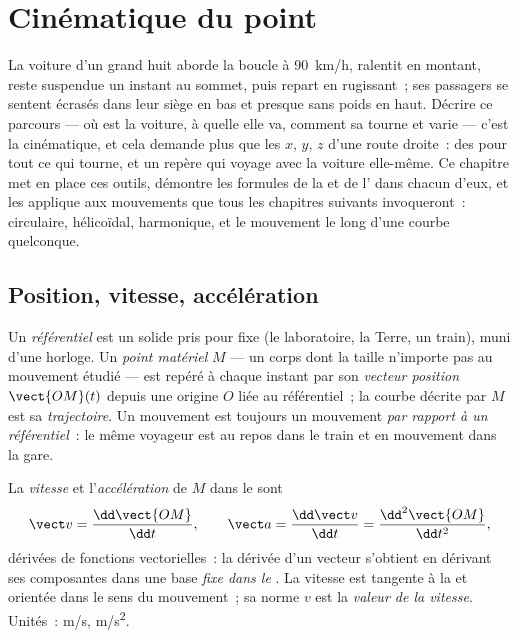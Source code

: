 \chapter{Cinématique du point}\label{ch:b1:point-kinematics}

La voiture d'un grand huit aborde la boucle à \qty{90}{km/h}, ralentit
en montant, reste suspendue un instant au sommet, puis repart en
rugissant~; ses passagers se sentent écrasés dans leur siège en bas et
presque sans poids en haut. Décrire ce parcours --- où est la voiture, à
quelle  elle va, comment sa  tourne et varie --- c'est la
cinématique, et cela demande plus que les $x$, $y$, $z$ d'une route
droite~: des  pour tout ce qui tourne, et un repère
qui voyage avec la voiture elle-même. Ce chapitre met en place ces
outils, démontre les formules de la  et de l' dans
chacun d'eux, et les applique aux mouvements que tous les chapitres
suivants invoqueront~: circulaire, hélicoïdal, harmonique, et le
mouvement le long d'une courbe quelconque.

\section{Position, vitesse, accélération}

\begin{definition}\label{def:b1:point-kinematics:frame}
Un \emph{référentiel} est un solide pris pour fixe (le laboratoire, la
Terre, un train), muni d'une horloge. Un \emph{point matériel} $M$ ---
un corps dont la taille n'importe pas au mouvement étudié --- est repéré
à chaque instant par son \emph{vecteur position} $\vect{OM}(t)$ depuis
une origine $O$ liée au référentiel~; la courbe décrite par $M$ est sa
\emph{trajectoire}. Un mouvement est toujours un mouvement
\emph{par rapport à un référentiel}~: le même voyageur est au repos dans
le train et en mouvement dans la gare.
\end{definition}

\begin{definition}\label{def:b1:point-kinematics:velocity}
La \emph{vitesse} et l'\emph{accélération} de $M$ dans le  sont
\[
\vect v = \frac{\dd\vect{OM}}{\dd t}, \qquad
\vect a = \frac{\dd\vect v}{\dd t} = \frac{\dd^2\vect{OM}}{\dd t^2},
\]
dérivées de fonctions vectorielles~: la dérivée d'un vecteur s'obtient
en dérivant ses composantes dans une base \emph{fixe dans le
}. La vitesse est tangente à la  et orientée dans
le sens du mouvement~; sa norme $v$ est la \emph{valeur de la vitesse}.
Unités~: \unit{m/s}, \unit{m/s^2}.
\end{definition}

